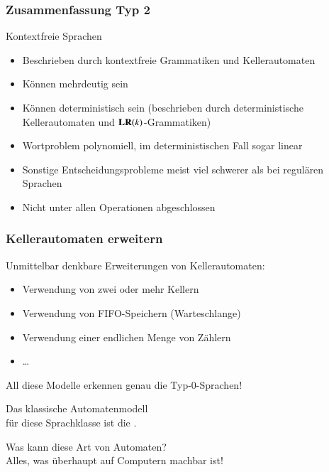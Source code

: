 \documentclass[onlymath]{beamer}
\begin{document}
\maketitle


\begin{frame}\frametitle{Zusammenfassung Typ 2}

Kontextfreie Sprachen
\begin{itemize}
\item Beschrieben durch \alert{kontextfreie Grammatiken} und \alert{Kellerautomaten}
\item Können \alert{mehrdeutig} sein
\item Können \alert{deterministisch} sein (beschrieben durch deterministische Kellerautomaten und $\textbf{\textcolor{black}{LR}}(k)$-Grammatiken)
\item Wortproblem polynomiell, im deterministischen Fall sogar linear
\item Sonstige Entscheidungsprobleme meist viel schwerer als bei regulären Sprachen 
\item Nicht unter allen Operationen abgeschlossen
\end{itemize}

\end{frame}


\begin{frame}\frametitle{Kellerautomaten erweitern}

Unmittelbar denkbare Erweiterungen von Kellerautomaten:
\begin{itemize}
\item Verwendung von zwei oder mehr Kellern
\item Verwendung von FIFO-Speichern (Warteschlange)
\item Verwendung einer endlichen Menge von Zählern
\item \ldots
\end{itemize}
\alert{All diese Modelle erkennen genau die Typ-0-Sprachen!}
\medskip\pause

Das klassische Automatenmodell\\für diese Sprachklasse ist die .%
%
\medskip\pause

Was kann diese Art von Automaten?\pause\\
Alles, was überhaupt auf Computern machbar ist!\medskip


\end{frame}
\end{document}
